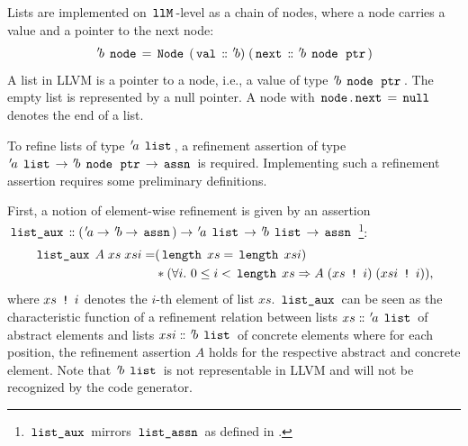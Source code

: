 Lists are implemented on $\,\text{\ttfamily llM}\,$-level as a chain of nodes, where a node carries a value and a pointer to the next node:
$$
	{\mskip2mu '\mskip-2mub} \; \,\text{\ttfamily node}\, = \,\text{\ttfamily Node}\, \; (\,\text{\ttfamily val}\, \mathrel{\mathord{:}\mkern-1.2mu\mathord{:}} {\mskip2mu '\mskip-2mub}) \; (\,\text{\ttfamily next}\, \mathrel{\mathord{:}\mkern-1.2mu\mathord{:}} {\mskip2mu '\mskip-2mub} \; \,\text{\ttfamily node}\, \; \,\text{\ttfamily ptr}\,)
$$
A list in LLVM is a pointer to a node, i.e., a value of type ${\mskip2mu '\mskip-2mub} \; \,\text{\ttfamily node}\, \; \,\text{\ttfamily ptr}\,$.
The empty list is represented by a null pointer.
A node with $\,\text{\ttfamily node}\,.\,\text{\ttfamily next}\, = \,\text{\ttfamily null}\,$ denotes the end of a list.

To refine lists of type ${\mskip2mu '\mskip-2mua} \; \,\text{\ttfamily list}\,$, a refinement assertion of type ${\mskip2mu '\mskip-2mua} \; \,\text{\ttfamily list}\, \rightarrow {\mskip2mu '\mskip-2mub} \; \,\text{\ttfamily node}\, \; \,\text{\ttfamily ptr}\, \rightarrow \,\text{\ttfamily assn}\,$ is required.
Implementing such a refinement assertion requires some preliminary definitions.

First, a notion of element-wise refinement is given by an assertion $\,\text{\ttfamily list\_aux}\, \mathrel{\mathord{:}\mkern-1.2mu\mathord{:}} ({\mskip2mu '\mskip-2mua} \rightarrow {\mskip2mu '\mskip-2mub} \rightarrow \,\text{\ttfamily assn}\,) \rightarrow {\mskip2mu '\mskip-2mua} \; \,\text{\ttfamily list}\, \rightarrow {\mskip2mu '\mskip-2mub} \; \,\text{\ttfamily list}\, \rightarrow \,\text{\ttfamily assn}\,$
\footnote{$\,\text{\ttfamily list\_aux}\,$ mirrors $\,\text{\ttfamily list\_assn}\,$ as defined in .}:
\begin{align*}
	\,\text{\ttfamily list\_aux}\, \; A \; xs \; xsi = & (\,\text{\ttfamily length}\, \; xs = \,\text{\ttfamily length}\, \; xsi)                                                                                 \\
	                                           & \ast (\forall i.\ 0 \le i < \,\text{\ttfamily length}\, \; xs \Rightarrow A \; (xs \; \,\text{\ttfamily !}\, \; i) \; (xsi \; \,\text{\ttfamily !}\, \; i)),
\end{align*}
where $xs \; \,\text{\ttfamily !}\, \; i$ denotes the $i$-th element of list $xs$.
$\,\text{\ttfamily list\_aux}\,$ can be seen as the characteristic function of a refinement relation between lists $xs \mathrel{\mathord{:}\mkern-1.2mu\mathord{:}} {\mskip2mu '\mskip-2mua} \; \,\text{\ttfamily list}\,$ of abstract elements and lists $xsi \mathrel{\mathord{:}\mkern-1.2mu\mathord{:}} {\mskip2mu '\mskip-2mub} \; \,\text{\ttfamily list}\,$ of concrete elements where for each position, the refinement assertion $A$ holds for the respective abstract and concrete element.
Note that ${\mskip2mu '\mskip-2mub} \; \,\text{\ttfamily list}\,$ is not representable in LLVM and will not be recognized by the code generator.

